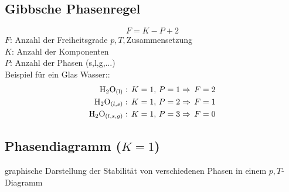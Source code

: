 \documentclass[a4paper, fleqn]{article}
\begin{document}
\subsection{Gibbsche Phasenregel}
\begin{equation*}
    F = K-P+2
\end{equation*}
$F$: Anzahl der Freiheitsgrade $p,T,$Zusammensetzung\\
$K$: Anzahl der Komponenten\\
$P$: Anzahl der Phasen (s,l,g,$\dots$)\\
Beispiel für ein Glas Wasser::
\begin{align*}
    \ce{H2O_{(l)}}&:\,K = 1,\,P=1\Rightarrow\,F=2\\
    \ce{H2O_{(l,s)}}&:\,K=1,\,P=2\Rightarrow\,F=1\\
    \ce{H2O_{(l,s,g)}}&:\,K=1,\,P=3\Rightarrow\,F=0\\
\end{align*}

\subsection{Phasendiagramm ($K=1$)}
graphische Darstellung der Stabilität von verschiedenen Phasen in einem $p,T$-Diagramm 
\end{document}
